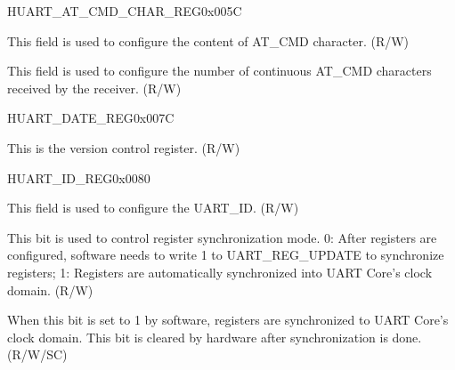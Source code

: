 \begin{register}{H}{UART\_AT\_CMD\_CHAR\_REG}{0x{}005C}\label{regdesc:UARTATCMDCHARREG}
%
%
%
\regnewline%
\begin{regdesc}\begin{reglist}
\label{fielddesc:UARTATCMDCHAR}\item [UART\_AT\_CMD\_CHAR] This field is used to configure the content of AT\_CMD character. (R/W)
\label{fielddesc:UARTCHARNUM}\item [UART\_CHAR\_NUM] This field is used to configure the number of continuous AT\_CMD characters received by the receiver. (R/W)
\end{reglist}\end{regdesc}
\end{register}


\begin{register}{H}{UART\_DATE\_REG}{0x{}007C}\label{regdesc:UARTDATEREG}
%
\regnewline%
\begin{regdesc}\begin{reglist}
\label{fielddesc:UARTDATE}\item [UART\_DATE] This is the version control register. (R/W)
\end{reglist}\end{regdesc}
\end{register}


\begin{register}{H}{UART\_ID\_REG}{0x{}0080}\label{regdesc:UARTIDREG}
%
%
%
\regnewline%
\begin{regdesc}\begin{reglist}
\label{fielddesc:UARTID}\item [UART\_ID] This field is used to configure the UART\_ID. (R/W)
\label{fielddesc:UARTUPDATECTRL}\item [UART\_UPDATE\_CTRL] This bit is used to control register synchronization mode. 0: After registers are configured, software needs to write 1 to UART\_REG\_UPDATE to synchronize registers; 1: Registers are automatically synchronized into UART Core's clock domain. (R/W)
\label{fielddesc:UARTREGUPDATE}\item [UART\_REG\_UPDATE] When this bit is set to 1 by software, registers are synchronized to UART Core's clock domain. This bit is cleared by hardware after synchronization is done. (R/W/SC)
\end{reglist}\end{regdesc}
\end{register}
